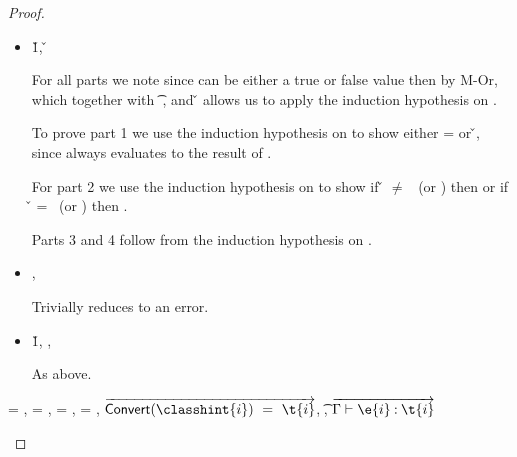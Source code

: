 \begin{lemma}
\begin{proof}
\begin{case}[T-Do]
\begin{itemize}
  \item[] \begin{subcase}[B-Do]
  \opsem {\openv{}} {} {\v{1}},
  \opsem {\openv{}} {} {\v{}}

For all parts we note 
    since {} can be either a true or false value
    then
    {}
    by M-Or,
    which together with 
           { {\t{}}} 
           {\filterset {\thenprop {\prop{}}} {\elseprop {\prop{}}}} 
           {\object{}},
    and
  \opsem {\openv{}} {} {\v{}}
    allows us to apply the induction hypothesis on .

To prove part 1 we use the induction hypothesis on 
to show either \object{} = \emptyobject{} 
or \inopenv {\openv{}} {\object{}} {\v{}}, since \e{} always
evaluates to the result of .

For part 2 we use the induction hypothesis on 
to show if \v{} $\not=$ \false\ (or \nil) then
        {\satisfies{\openv{}}{\thenprop{\prop{}}}}
        or
  if \v{} = \false\ (or \nil) then
        {\satisfies{\openv{}}{\elseprop{\prop{}}}}.

Parts 3 and 4 follow from the induction hypothesis on .
    \end{subcase}
  \item[]

\begin{subcase}[BE-Do1]
  \opsem {\openv{}} {} {},
  \opsem {\openv{}} {\e{}} {\errorval{\v{}}}

        Trivially reduces to an error.
\end{subcase}
  \item[]
\begin{subcase}[BE-Do2]
  \opsem {\openv{}} {} {\v{1}},
  \opsem {\openv{}} {} {\errorvalv{}},
  \opsem {\openv{}} {\e{}} {\errorvalv{}}

        As above.
\end{subcase}
\end{itemize}
\end{case}

\begin{case}[T-NewStatic]
  \e{} = { {\classhint{}} 
                                                          {\class{}} {}},
  \object{} = \emptyobject{},
\thenprop{\prop{}} = \topprop{},
\elseprop{\prop{}} = \botprop{},
   $\overrightarrow{
\javatotc {\classhint{i}}
          {\t{i}}
          }$,
  \javatotc {\classhint{}}
            {\t{}},
            $
  \overrightarrow{
  \judgementtwo {\propenv{}}
                    {\hastype {\e{i}} {\t{i}}}
                  }$


\end{case}
\end{proof}
\end{lemma}
